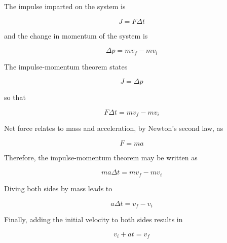 \documentclass[]{exam}
\theoremstyle{definition}
\begin{document}
\begin{questions}
\begin{parts}
The impulse imparted on the system is

\bgroup
\ifprintanswers \color{red} \else \color{white} \fi
\begin{equation*}
    J = F \Delta t
\end{equation*}
\egroup

and the change in momentum of the system is

\bgroup
\ifprintanswers \color{red} \else \color{white} \fi
\begin{equation*}
    \Delta p = mv_f - m v_i
\end{equation*}
\egroup

The impulse-momentum theorem states

\bgroup
\ifprintanswers \color{red} \else \color{white} \fi
\begin{equation*}
    J = \Delta p
\end{equation*}
\egroup

so that

\bgroup
\ifprintanswers \color{red} \else \color{white} \fi
\begin{equation*}
     F \Delta t = m v_f - m v_i
\end{equation*}
\egroup

Net force relates to mass and acceleration, by Newton's second law, as

\bgroup
\ifprintanswers \color{red} \else \color{white} \fi
\begin{equation*}
    F = ma
\end{equation*}
\egroup

Therefore, the impulse-momentum theorem may be written as

\bgroup
\ifprintanswers \color{red} \else \color{white} \fi
\begin{equation*}
     ma \Delta t = m v_f - m v_i
\end{equation*}
\egroup

Diving both sides by mass leads to

\bgroup
\ifprintanswers \color{red} \else \color{white} \fi
\begin{equation*}
     a \Delta t = v_f - v_i
\end{equation*}
\egroup

Finally, adding the initial velocity to both sides results in 

\bgroup
\ifprintanswers \color{red} \else \color{white} \fi
\begin{equation*}
     v_i + a t = v_f
\end{equation*}
\egroup


\end{parts}
\end{questions}
\end{document}
